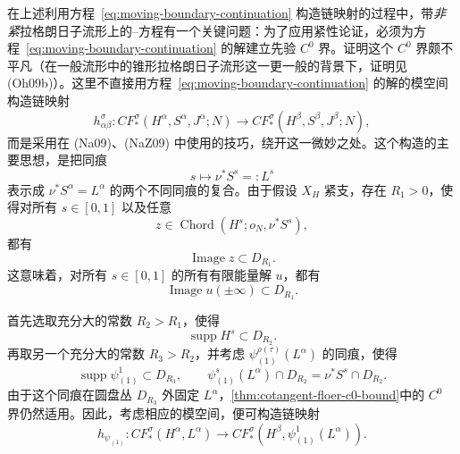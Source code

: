 在上述利用方程~\eqref{eq:moving-boundary-continuation} 构造链映射的过程中，带\emph{非紧}拉格朗日子流形上\emph{\termMovingBoundaryCondition{}}的\personCauchy{}--\personRiemann{}方程有一个关键问题：为了应用紧性论证，必须为方程~\eqref{eq:moving-boundary-continuation} 的解建立先验 $C^0$ 界。证明这个 $C^0$ 界颇不平凡（在一般\personWeinstein{}流形中的锥形拉格朗日子流形这一更一般的背景下，证明见 (Oh09b)）。这里不直接用方程~\eqref{eq:moving-boundary-continuation} 的解的模空间构造链映射
\[
  h_{\alpha\beta}^\sigma:
  CF_*^\sigma(H^\alpha,S^\alpha,J^\alpha;N)
  \longrightarrow
  CF_*^\sigma(H^\beta,S^\beta,J^\beta;N),
\]
而是采用\personDavidNadler{}在 (Na09)、(NaZ09) 中使用的技巧，绕开这一微妙之处。这个构造的主要思想，是把同痕
\[
  s\longmapsto\nu^*S^s=:L^s
\]
表示成 $\nu^*S^\alpha=L^\alpha$ 的两个不同同痕的复合。由于假设 $X_H$ 紧支，存在 $R_1>0$，使得对所有 $s\in[0,1]$ 以及任意
\[
  z\in\operatorname{Chord}(H^s;o_N,\nu^*S^s),
\]
都有
\[
  \operatorname{Image}z\subset D_{R_1}.
\]
这意味着，对所有 $s\in[0,1]$ 的所有有限能量解 $u$，都有
\[
  \operatorname{Image}u(\pm\infty)\subset D_{R_1}.
\]

首先选取充分大的常数 $R_2>R_1$，使得
\[
  \operatorname{supp}H^s\subset D_{R_2}.
\]
再取另一个充分大的常数 $R_3>R_2$，并考虑 $\psi_{(1)}^{\rho(\tau)}(L^\alpha)$ 的同痕，使得
\[
  \operatorname{supp}\psi_{(1)}^1\subset D_{R_3},
  \qquad
  \psi_{(1)}^s(L^\alpha)\cap D_{R_2}
  =\nu^*S^s\cap D_{R_2}.
\]
由于这个同痕在圆盘丛 $D_{R_3}$ 外固定 $L^\alpha$，\cref{thm:cotangent-floer-c0-bound}中的 $C^0$ 界仍然适用。因此，考虑相应的\personFloer{}模空间，便可构造链映射
\[
  h_{\psi_{(1)}}:
  CF_*^\sigma(H^\alpha,L^\alpha)
  \longrightarrow
  CF_*^\sigma(H^\beta,\psi_{(1)}^1(L^\alpha)).
\]

